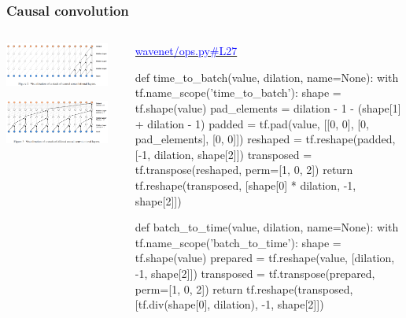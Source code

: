 \documentclass[8pt]{beamer}
\begin{document}
\begin{frame}[fragile]
\frametitle{Causal convolution}
\begin{columns}
\begin{column}{0.5\textwidth}
 
\includegraphics[width=0.9\textwidth]{./dl3_images/causal_convolutions.png}

\includegraphics[width=0.9\textwidth]{./dl3_images/dilated_causal_convolutions.png}

\end{column}
\begin{column}{0.5\textwidth}
 
 \href{https://github.com/ibab/tensorflow-wavenet/blob/master/wavenet/ops.py\#L27}{\textcolor{blue}{wavenet/ops.py\#L27}}
 
 \begin{verbnobox}[\tiny]
def time_to_batch(value, dilation, name=None):
    with tf.name_scope('time_to_batch'):
        shape = tf.shape(value)
        pad_elements = dilation - 1 - (shape[1] + dilation - 1) %
        padded = tf.pad(value, [[0, 0], [0, pad_elements], [0, 0]])
        reshaped = tf.reshape(padded, [-1, dilation, shape[2]])
        transposed = tf.transpose(reshaped, perm=[1, 0, 2])
        return tf.reshape(transposed, [shape[0] * dilation, -1, shape[2]])

def batch_to_time(value, dilation, name=None):
    with tf.name_scope('batch_to_time'):
        shape = tf.shape(value)
        prepared = tf.reshape(value, [dilation, -1, shape[2]])
        transposed = tf.transpose(prepared, perm=[1, 0, 2])
        return tf.reshape(transposed,
                          [tf.div(shape[0], dilation), -1, shape[2]])


\end{verbnobox}
\end{column}
\end{columns}
\end{frame}
\end{document}
